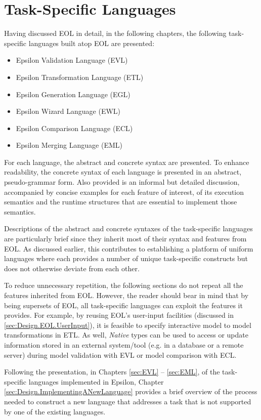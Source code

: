 \section{Task-Specific Languages}
\label{sec:TaskSpecificLanguages}

Having discussed EOL in detail, in the following chapters, the following task-specific languages built atop EOL are presented:

\begin{itemize}
	\item Epsilon Validation Language (EVL)
	\item Epsilon Transformation Language (ETL)
	\item Epsilon Generation Language (EGL)
	\item Epsilon Wizard Language (EWL)
	\item Epsilon Comparison Language (ECL)
	\item Epsilon Merging Language (EML)
\end{itemize}

For each language, the abstract and concrete syntax are presented. To enhance readability, the concrete syntax of each language is presented in an abstract, pseudo-grammar form. Also provided is an informal but detailed discussion, accompanied by concise examples for each feature of interest, of its execution semantics and the runtime structures that are essential to implement those semantics.

Descriptions of the abstract and concrete syntaxes of the task-specific languages are particularly brief since they inherit most of their syntax and features from EOL. As discussed earlier, this contributes to establishing a platform of uniform languages where each provides a number of unique task-specific constructs but does not otherwise deviate from each other.

To reduce unnecessary repetition, the following sections do not repeat all the features inherited from EOL. However, the reader should bear in mind that by being supersets of EOL, all task-specific languages can exploit the features it provides. For example, by reusing EOL's user-input facilities (discussed in \ref{sec:Design.EOL.UserInput}), it is feasible to specify interactive model to model transformations in ETL. As well, \emph{Native} types can be used to access or update information stored in an external system/tool (e.g. in a database or a remote server) during model validation with EVL or model comparison with ECL.

Following the presentation, in Chapters \ref{sec:EVL} -- \ref{sec:EML}, of the task-specific languages implemented in Epsilon, Chapter \ref{sec:Design.ImplementingANewLanguage} provides a brief overview of the process needed to construct a new language that addresses a task that is not supported by one of the existing languages.













